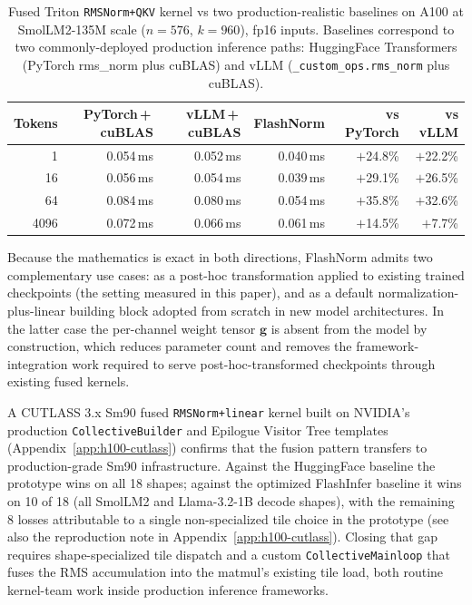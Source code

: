 \documentclass{article}
\begin{document}
\begin{table}[h!] \centering
\caption{Fused Triton \texttt{RMSNorm+QKV} kernel vs two production-realistic baselines on A100 at SmolLM2-135M scale ($n{=}576$, $k{=}960$), fp16 inputs. Baselines correspond to two commonly-deployed production inference paths: HuggingFace Transformers (PyTorch rms\_norm plus cuBLAS) and vLLM (\texttt{\_custom\_ops.rms\_norm} plus cuBLAS).}
\label{tab:a100-fused}
\begin{tabular}{r r r r r r}
\hline
Tokens & PyTorch\,+\,cuBLAS & vLLM\,+\,cuBLAS & FlashNorm & vs PyTorch & vs vLLM \\
\hline
1     & 0.054\,ms & 0.052\,ms & 0.040\,ms & $+$24.8\% & $+$22.2\% \\
16    & 0.056\,ms & 0.054\,ms & 0.039\,ms & $+$29.1\% & $+$26.5\% \\
64    & 0.084\,ms & 0.080\,ms & 0.054\,ms & $+$35.8\% & $+$32.6\% \\
4096  & 0.072\,ms & 0.066\,ms & 0.061\,ms & $+$14.5\% & $+$7.7\%  \\
\hline
\end{tabular}
\end{table}

Because the mathematics is exact in both directions, FlashNorm admits two complementary use cases: as a post-hoc transformation applied to existing trained checkpoints (the setting measured in this paper), and as a default normalization-plus-linear building block adopted from scratch in new model architectures. In the latter case the per-channel weight tensor $\mathbf{g}$ is absent from the model by construction, which reduces parameter count and removes the framework-integration work required to serve post-hoc-transformed checkpoints through existing fused kernels.

A CUTLASS 3.x Sm90 fused \texttt{RMSNorm+linear} kernel built on NVIDIA's production \texttt{CollectiveBuilder} and Epilogue Visitor Tree templates (Appendix~\ref{app:h100-cutlass}) confirms that the fusion pattern transfers to production-grade Sm90 infrastructure. Against the HuggingFace baseline the prototype wins on all 18 shapes; against the optimized FlashInfer baseline it wins on 10 of 18 (all SmolLM2 and Llama-3.2-1B decode shapes), with the remaining 8 losses attributable to a single non-specialized tile choice in the prototype (see also the reproduction note in Appendix~\ref{app:h100-cutlass}). Closing that gap requires shape-specialized tile dispatch and a custom \texttt{CollectiveMainloop} that fuses the RMS accumulation into the matmul's existing tile load, both routine kernel-team work inside production inference frameworks.
\end{document}
